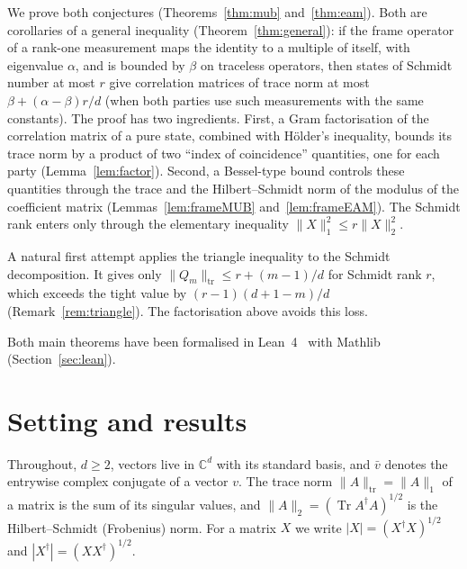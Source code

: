 \documentclass[11pt]{amsart}
\theoremstyle{definition}
\theoremstyle{remark}
\newcommand{\C}{\mathbb{C}}
\newcommand{\Tr}{\operatorname{Tr}}
\newcommand{\tr}{\mathrm{tr}}
\begin{document}
We prove both conjectures (Theorems~\ref{thm:mub} and~\ref{thm:eam}). Both are corollaries of a general
inequality (Theorem~\ref{thm:general}): if the frame operator of a rank-one measurement maps the identity to a
multiple of itself, with eigenvalue $\alpha$, and is bounded by $\beta$ on traceless operators, then states of
Schmidt number at most $r$ give correlation matrices of trace norm at most $\beta+(\alpha-\beta)r/d$ (when both
parties use such measurements with the same constants). The proof has two ingredients. First, a Gram
factorisation of the correlation matrix of a pure state, combined with H\"older's inequality, bounds its trace
norm by a product of two ``index of coincidence'' quantities, one for each party (Lemma~\ref{lem:factor}).
Second, a Bessel-type bound controls these quantities through the trace and the Hilbert--Schmidt norm of the
modulus of the coefficient matrix (Lemmas~\ref{lem:frameMUB} and~\ref{lem:frameEAM}). The Schmidt rank enters only
through the elementary inequality $\|X\|_1^2\le r\|X\|_2^2$.

A natural first attempt applies the triangle inequality to the Schmidt decomposition. It gives only
$\|Q_m\|_{\tr}\le r+(m-1)/d$ for Schmidt rank $r$, which exceeds the tight value by $(r-1)(d+1-m)/d$
(Remark~\ref{rem:triangle}). The factorisation above avoids this loss.

Both main theorems have been formalised in Lean~4~\cite{Lean4} with Mathlib~\cite{Mathlib2020}
(Section~\ref{sec:lean}).

\section{Setting and results}\label{sec:results}

Throughout, $d\ge2$, vectors live in $\C^d$ with its standard basis, and $\bar v$ denotes the entrywise complex
conjugate of a vector $v$. The trace norm $\|A\|_{\tr}=\|A\|_1$ of a matrix is the sum of its singular values,
and $\|A\|_2=(\Tr A^\dagger A)^{1/2}$ is the Hilbert--Schmidt (Frobenius) norm. For a matrix $X$ we write
$|X|=(X^\dagger X)^{1/2}$ and $|X^\dagger|=(XX^\dagger)^{1/2}$.
\end{document}
